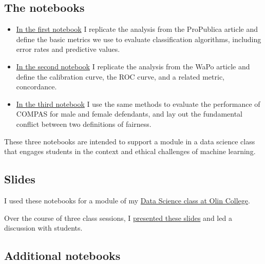 \hypertarget{the-notebooks}{%
\subsection{The notebooks}\label{the-notebooks}}

\begin{itemize}
\item
  \href{https://colab.research.google.com/github/AllenDowney/RecidivismCaseStudy/blob/master/01_classification.ipynb}{In
  the first notebook} I replicate the analysis from the ProPublica
  article and define the basic metrics we use to evaluate classification
  algorithms, including error rates and predictive values.
\item
  \href{https://colab.research.google.com/github/AllenDowney/RecidivismCaseStudy/blob/master/02_calibration.ipynb}{In
  the second notebook} I replicate the analysis from the WaPo article
  and define the calibration curve, the ROC curve, and a related metric,
  concordance.
\item
  \href{https://colab.research.google.com/github/AllenDowney/RecidivismCaseStudy/blob/master/03_fairness.ipynb}{In
  the third notebook} I use the same methods to evaluate the performance
  of COMPAS for male and female defendants, and lay out the fundamental
  conflict between two definitions of fairness.
\end{itemize}

These three notebooks are intended to support a module in a data science
class that engages students in the context and ethical challenges of
machine learning.

\hypertarget{slides}{%
\subsection{Slides}\label{slides}}

I used these notebooks for a module of my
\href{https://sites.google.com/site/olinds20/}{Data Science class at
Olin College}.

Over the course of three class sessions, I
\href{https://github.com/AllenDowney/RecidivismCaseStudy/raw/master/Recidivism\%20Case\%20Study.pdf}{presented
these slides} and led a discussion with students.

\hypertarget{additional-notebooks}{%
\subsection{Additional notebooks}\label{additional-notebooks}}

